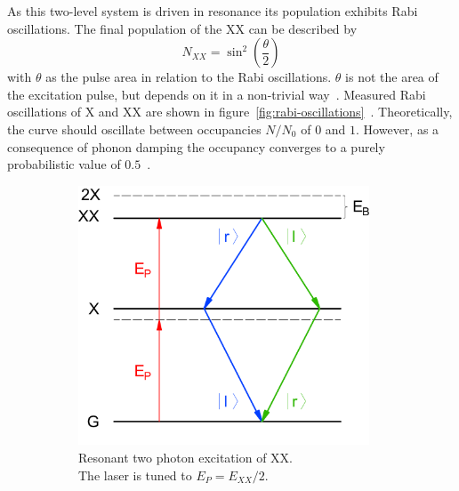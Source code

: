 As this two-level system is driven in resonance its population exhibits Rabi oscillations.
The final population of the \ac{XX} can be described by
\begin{equation}
N_{XX} = \sin^2\left(\frac{\theta}{2}\right)
\end{equation}
with $\theta$ as the pulse area in relation to the Rabi oscillations. $\theta$ is not the area of the excitation pulse, but depends on it in a non-trivial way~\cite{stufler_two-photon_2006}.
Measured Rabi oscillations of \ac{X} and \ac{XX} are shown in figure~\ref{fig:rabi-oscillations}~\cite{reindl_phonon-assisted_2017}.
Theoretically, the curve should oscillate between occupancies $N/N_0$ of $0$ and $1$.
However, as a consequence of phonon damping the occupancy converges to a purely probabilistic value of $0.5$~\cite{forstner_phonon-assisted_2003}.
\begin{figure}[H]
	\centering
	\begin{subfigure}[b]{0.48\textwidth}
		\centering
		\includegraphics[width=0.95\textwidth]{figures/quantum-dot/QD_Resonant.pdf}
		\caption{Resonant two photon excitation of \ac{XX}.\\
			The laser is tuned to $E_P = E_{XX} / 2$.}
		\label{fig:qd-resonant}
	\end{subfigure}%
	~ %
	\begin{subfigure}[b]{0.48\textwidth}

\end{subfigure}
\end{figure}
